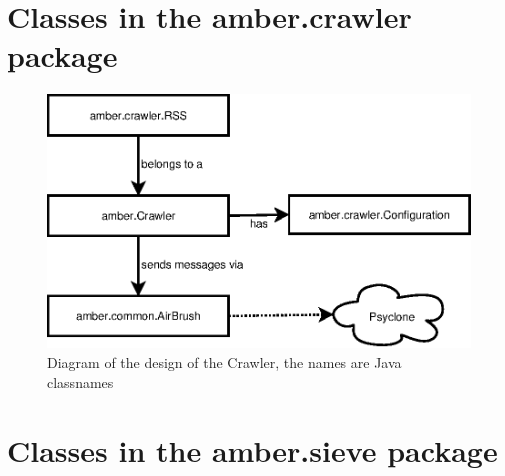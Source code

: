 \section{Classes in the amber.crawler package}


\begin{classmetadata}
\end{classmetadata}

\begin{classinterface}
\end{classinterface}




\begin{classmetadata}
\end{classmetadata}

\begin{classinterface}
\end{classinterface}



\begin{figure}
  \centering
  \includegraphics{image/crawler}
  \caption{
    Diagram of the design of the Crawler, the names are Java classnames
  }
\end{figure}


\section{Classes in the amber.sieve package}


